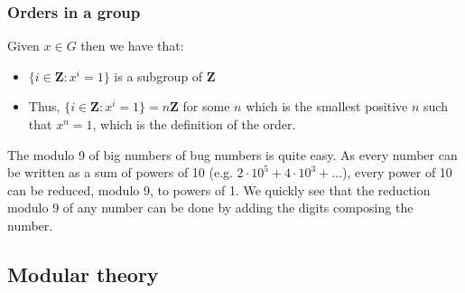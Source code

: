 \documentclass[11pt,a4paper]{article}
\newcommand{\bz}{\ensuremath{\mathbf{Z}}}
\begin{document}
\subsubsection{Orders in a group}
Given $x \in G$ then we have that:
\begin{itemize}
    \item $\{i \in \bz: x^i = 1\}$ is a subgroup of \bz
    \item Thus, $\{i \in \bz: x^i = 1\} = n\bz$ for some $n$ which is the smallest positive $n$ such that $x^n = 1$, which is the definition of the order.
\end{itemize}
\todo{}

\begin{example}
    The modulo 9 of big numbers of bug numbers is quite easy. As every number can be written as a sum of powers of 10 (e.g. $2\cdot 10^5 + 4\cdot 10^3 + \ldots$), every power of 10 can be reduced, modulo 9, to powers of 1. We quickly see that the reduction modulo 9 of any number can be done by adding the digits composing the number.
\end{example}

\subsection{Modular theory}
\end{document}
